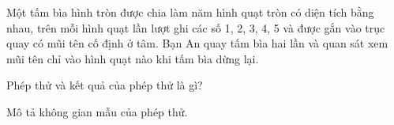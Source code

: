 \begin{practice}
\begin{questions}[series=SBT]
        \answerline
        \answerline

        \item Một tấm bìa hình tròn được chia làm năm hình quạt tròn có diện tích bằng nhau, trên mỗi hình quạt lần lượt ghi các số 1, 2, 3, 4, 5 và được gắn vào trục quay có mũi tên cố định ở tâm. Bạn An quay tấm bìa hai lần và quan sát xem mũi tên chỉ vào hình quạt nào khi tấm bìa dừng lại.
        \begin{questions}
            \item Phép thử và kết quả của phép thử là gì?
            \item Mô tả không gian mẫu của phép thử.
        \end{questions}

        \answerline
        \answerline
    \end{questions}
\end{practice}
